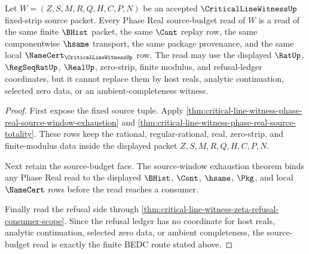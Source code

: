 \begin{theorem}
\label{thm:critical-line-witness-phase-real-source-budget-readiness}
Let $W=(Z,S,M,R,Q,H,C,P,N)$ be an accepted $\CriticalLineWitnessUp$ fixed-strip source packet. Every Phase Real source-budget read of $W$ is a read of the same finite $\BHist$ packet, the same $\Cont$ replay row, the same componentwise $\hsame$ transport, the same package provenance, and the same local $\NameCert_{\CriticalLineWitnessUp}$ row. The read may use the displayed $\RatUp$, $\RegSeqRatUp$, $\RealUp$, zero-strip, finite modulus, and refusal-ledger coordinates, but it cannot replace them by host reals, analytic continuation, selected zero data, or an ambient-completeness witness.
\end{theorem}
\begin{proof}
First expose the fixed source tuple. Apply \autoref{thm:critical-line-witness-phase-real-source-window-exhaustion} and \autoref{thm:critical-line-witness-phase-real-source-totality}. These rows keep the rational, regular-rational, real, zero-strip, and finite-modulus data inside the displayed packet $Z,S,M,R,Q,H,C,P,N$.

Next retain the source-budget face. The source-window exhaustion theorem binds any Phase Real read to the displayed $\BHist$, $\Cont$, $\hsame$, $\Pkg$, and local $\NameCert$ rows before the read reaches a consumer.

Finally read the refusal side through \autoref{thm:critical-line-witness-zeta-refusal-consumer-scope}. Since the refusal ledger has no coordinate for host reals, analytic continuation, selected zero data, or ambient completeness, the source-budget read is exactly the finite BEDC route stated above.
\end{proof}

